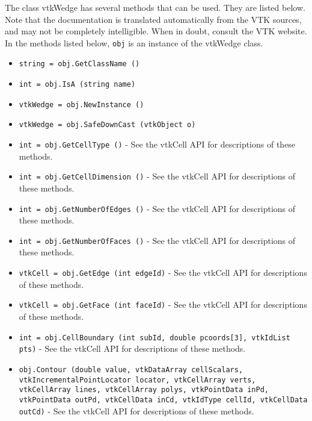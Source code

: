 The class vtkWedge has several methods that can be used.
  They are listed below.
Note that the documentation is translated automatically from the VTK sources,
and may not be completely intelligible.  When in doubt, consult the VTK website.
In the methods listed below, \verb|obj| is an instance of the vtkWedge class.
\begin{itemize}
\item  \verb|string = obj.GetClassName ()|

\item  \verb|int = obj.IsA (string name)|

\item  \verb|vtkWedge = obj.NewInstance ()|

\item  \verb|vtkWedge = obj.SafeDownCast (vtkObject o)|

\item  \verb|int = obj.GetCellType ()| -  See the vtkCell API for descriptions of these methods.

\item  \verb|int = obj.GetCellDimension ()| -  See the vtkCell API for descriptions of these methods.

\item  \verb|int = obj.GetNumberOfEdges ()| -  See the vtkCell API for descriptions of these methods.

\item  \verb|int = obj.GetNumberOfFaces ()| -  See the vtkCell API for descriptions of these methods.

\item  \verb|vtkCell = obj.GetEdge (int edgeId)| -  See the vtkCell API for descriptions of these methods.

\item  \verb|vtkCell = obj.GetFace (int faceId)| -  See the vtkCell API for descriptions of these methods.

\item  \verb|int = obj.CellBoundary (int subId, double pcoords[3], vtkIdList pts)| -  See the vtkCell API for descriptions of these methods.

\item  \verb|obj.Contour (double value, vtkDataArray cellScalars, vtkIncrementalPointLocator locator, vtkCellArray verts, vtkCellArray lines, vtkCellArray polys, vtkPointData inPd, vtkPointData outPd, vtkCellData inCd, vtkIdType cellId, vtkCellData outCd)| -  See the vtkCell API for descriptions of these methods.


\end{itemize}
